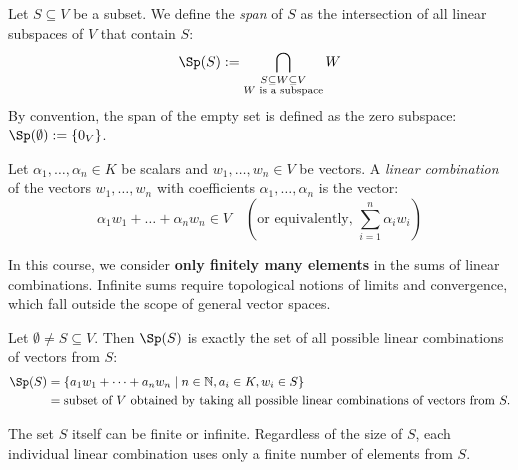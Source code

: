 \begin{definition}[Span]
Let $S \subseteq V$ be a subset. We define the \textit{span} of $S$ as the intersection of all linear subspaces of $V$ that contain $S$:
\[
\Sp(S) := \bigcap_{\substack{S \subseteq W \subseteq V \\ W \text{ is a subspace}}} W
\]
By convention, the span of the empty set is defined as the zero subspace: $\Sp(\emptyset) := \{0_V\}$.
\end{definition}

\begin{definition}
Let $\alpha_1, \dots, \alpha_n \in K$ be scalars and $w_1, \dots, w_n \in V$ be vectors. A \textit{linear combination} of the vectors $w_1, \dots, w_n$ with coefficients $\alpha_1, \dots, \alpha_n$ is the vector:
\[
\alpha_1 w_1 + \dots + \alpha_n w_n \in V \quad \left(\text{or equivalently, } \sum_{i=1}^n \alpha_i w_i\right)
\]
\end{definition}

\begin{importantremark}
In this course, we consider \textbf{only finitely many elements} in the sums of linear combinations. Infinite sums require topological notions of limits and convergence, which fall outside the scope of general vector spaces.
\end{importantremark}

\begin{lemma}
Let $\emptyset \ne S \subseteq V$. Then $\Sp(S)$ is exactly the set of all possible linear combinations of vectors from $S$:
\begin{align*}
\Sp(S) &= \{a_1 w_1 + \dots + a_n w_n \mid n \in \mathbb{N}, a_i \in K, w_i \in S\} \\
&= \text{subset of } V \text{ obtained by taking all possible linear combinations of vectors from } S.
\end{align*}
\end{lemma}

\begin{remark}
The set $S$ itself can be finite or infinite. Regardless of the size of $S$, each individual linear combination uses only a finite number of elements from $S$.
\end{remark}

